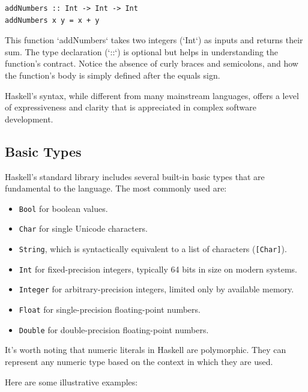 \documentclass[a4paper, 10pt]{article}
\begin{document}
            \begin{lstlisting}
addNumbers :: Int -> Int -> Int
addNumbers x y = x + y
            \end{lstlisting}

            This function `addNumbers` takes two integers (`Int`) as inputs and returns their sum. The type declaration (`::`) is optional but helps in understanding the function's contract. Notice the absence of curly braces and semicolons, and how the function's body is simply defined after the equals sign.

            Haskell's syntax, while different from many mainstream languages, offers a level of expressiveness and clarity that is appreciated in complex software development.

        \subsection{Basic Types}

            Haskell's standard library includes several built-in basic types that are fundamental to the language. The most commonly used are:

            \begin{itemize}
                \item \texttt{Bool} for boolean values.
                \item \texttt{Char} for single Unicode characters.
                \item \texttt{String}, which is syntactically equivalent to a list of characters (\texttt{[Char]}).
                \item \texttt{Int} for fixed-precision integers, typically 64 bits in size on modern systems.
                \item \texttt{Integer} for arbitrary-precision integers, limited only by available memory.
                \item \texttt{Float} for single-precision floating-point numbers.
                \item \texttt{Double} for double-precision floating-point numbers.
            \end{itemize}

            It's worth noting that numeric literals in Haskell are polymorphic. They can represent any numeric type based on the context in which they are used.

            Here are some illustrative examples:
\end{document}
